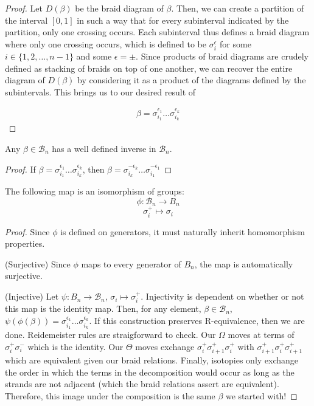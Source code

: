 \noindent \begin{proof}\cite{Kassel}  Let $D(\beta)$ be the braid diagram of $\beta$. Then, we can create a partition of the interval $[0,1]$ in such a way that for every subinterval indicated by the partition, only one crossing occurs. Each subinterval thus defines a braid diagram where only one crossing occurs, which is defined to be $\sigma_i^\epsilon$ for some $i\in\{1,2,\hdots,n-1\}$ and some $\epsilon = \pm$. Since products of braid diagrams are crudely defined as stacking of braids on top of one another, we can recover the entire diagram of $D(\beta)$ by considering it as a product of the diagrams defined by the subintervals. This brings us to our desired result of 

\begin{equation}
\begin{aligned}
\beta = \sigma^{\epsilon_1}_{i_1}\hdots\sigma^{\epsilon_k}_{i_k}  
\end{aligned}
\end{equation}
\end{proof}

\begin{corrolary}
	Any $\beta\in\mathcal{B}_n$ has a well defined inverse in $\mathcal{B}_n$.
\end{corrolary}

\noindent\begin{proof}\cite{Kassel}  If $\beta = \sigma^{\epsilon_1}_{i_1}\hdots\sigma^{\epsilon_k}_{i_k}$, then $\beta = \sigma^{-\epsilon_k}_{i_k}\hdots\sigma^{-\epsilon_1}_{i_1}$ \end{proof} 

\begin{theorem}
	The following map is an isomorphism of groups:
$$\phi:\mathcal{B}_n\rightarrow B_n$$
$$\sigma_i^+ \mapsto \sigma_i$$
\end{theorem}

\noindent\begin{proof}\cite{Kassel}  Since $\phi$ is defined on generators, it must naturally inherit homomorphism properties. 

(Surjective) Since $\phi$ maps to every generator of $B_n$, the map is automatically surjective.

(Injective) Let $\psi:B_n\rightarrow\mathcal{B}_n$, $\sigma_i\mapsto\sigma_i^+$. Injectivity is dependent on whether or not this map is the identity map. Then, for any element, $\beta\in\mathcal{B}_n$, $\psi(\phi(\beta)) = \sigma^{\epsilon_1}_{i_1}\hdots\sigma^{\epsilon_k}_{i_k}$. If this construction preserves R-equivalence, then we are done. Reidemeister rules are straigforward to check. Our $\Omega$ moves at terms of $\sigma_i^+\sigma_i^-$ which is the identity. Our $\Theta$ moves exchange $\sigma_i^+\sigma_{i+1}^+\sigma_i^+$ with $\sigma_{i+1}^+\sigma_i^+\sigma_{i+1}^+$ which are equivalent given our braid relations. Finally, isotopies only exchange the order in which the terms in the decomposition would occur as long as the strands are not adjacent (which the braid relations assert are equivalent). Therefore, this image under the composition is the same $\beta$ we started with! \end{proof} 

